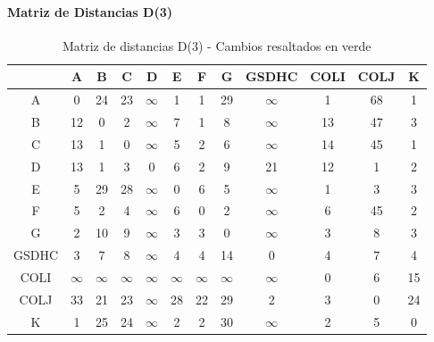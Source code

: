 \documentclass[12pt]{article}
\begin{document}
\paragraph{Matriz de Distancias D(3)}
\begin{table}[h!]
\centering
\begin{tabular}{|c|c|c|c|c|c|c|c|c|c|c|c|}
\hline
 & A & B & C & D & E & F & G & GSDHC & COLI & COLJ & K \\\hline
A & 0 & \cellcolor{lightgreen} 24 & 23 & $\infty$ & 1 & 1 & \cellcolor{lightgreen} 29 & $\infty$ & 1 & \cellcolor{lightgreen} 68 & 1 \\\hline
B & 12 & 0 & 2 & $\infty$ & \cellcolor{lightgreen} 7 & 1 & \cellcolor{lightgreen} 8 & $\infty$ & 13 & \cellcolor{lightgreen} 47 & \cellcolor{lightgreen} 3 \\\hline
C & 13 & 1 & 0 & $\infty$ & 5 & 2 & 6 & $\infty$ & 14 & 45 & 1 \\\hline
D & 13 & 1 & 3 & 0 & 6 & 2 & \cellcolor{lightgreen} 9 & 21 & 12 & 1 & 2 \\\hline
E & 5 & \cellcolor{lightgreen} 29 & 28 & $\infty$ & 0 & 6 & 5 & $\infty$ & 1 & 3 & 3 \\\hline
F & 5 & 2 & 4 & $\infty$ & 6 & 0 & 2 & $\infty$ & 6 & 45 & 2 \\\hline
G & 2 & \cellcolor{lightgreen} 10 & 9 & $\infty$ & 3 & 3 & 0 & $\infty$ & 3 & 8 & 3 \\\hline
GSDHC & 3 & 7 & 8 & $\infty$ & 4 & 4 & \cellcolor{lightgreen} 14 & 0 & 4 & 7 & 4 \\\hline
COLI & $\infty$ & $\infty$ & $\infty$ & $\infty$ & $\infty$ & $\infty$ & $\infty$ & $\infty$ & 0 & 6 & 15 \\\hline
COLJ & 33 & 21 & 23 & $\infty$ & \cellcolor{lightgreen} 28 & 22 & \cellcolor{lightgreen} 29 & 2 & 3 & 0 & \cellcolor{lightgreen} 24 \\\hline
K & 1 & \cellcolor{lightgreen} 25 & 24 & $\infty$ & 2 & 2 & \cellcolor{lightgreen} 30 & $\infty$ & 2 & 5 & 0 \\\hline
\end{tabular}
\caption{Matriz de distancias D(3) - Cambios resaltados en verde}
\end{table}
\end{document}
